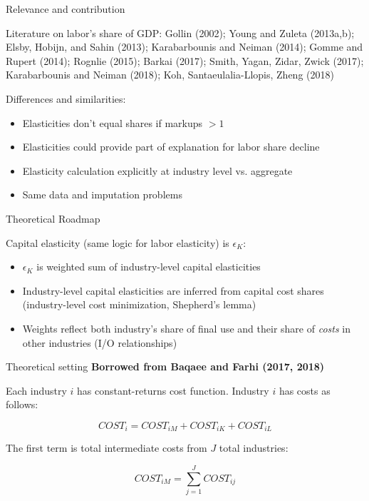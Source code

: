 \documentclass[10pt,xcolor=dvipsnames]{beamer}
\begin{document}
\begin{frame}{Relevance and contribution}

Literature on labor's share of GDP: Gollin (2002); Young and Zuleta (2013a,b); Elsby, Hobijn, and Sahin (2013); Karabarbounis and Neiman (2014); Gomme and Rupert (2014); Rognlie (2015); Barkai (2017); Smith, Yagan, Zidar, Zwick (2017); Karabarbounis and Neiman (2018); Koh, Santaeulalia-Llopis, Zheng (2018)

\vspace{.25in}
Differences and similarities:
\begin{itemize}
  \item Elasticities don't equal shares if markups $>1$
  \item Elasticities could provide part of explanation for labor share decline
  \item Elasticity calculation explicitly at industry level vs. aggregate
  \item Same data and imputation problems
\end{itemize}

\end{frame}


\begin{frame}{Theoretical Roadmap}

Capital elasticity (same logic for labor elasticity) is $\epsilon_K$:
\begin{itemize}
  \item $\epsilon_K$ is weighted sum of industry-level capital elasticities
  \item Industry-level capital elasticities are inferred from capital cost shares (industry-level cost minimization, Shepherd's lemma)
  \item Weights reflect both industry's share of final use and their share of \textit{costs} in other industries (I/O relationships)
\end{itemize}
\end{frame}

\begin{frame}{Theoretical setting}
\textbf{Borrowed from Baqaee and Farhi (2017, 2018)}
\vspace{.25in}

Each industry $i$ has constant-returns cost function. Industry $i$ has costs as follows:

\begin{equation}
  COST_i = COST_{iM} + COST_{iK} + COST_{iL}
\end{equation}

The first term is total intermediate costs from $J$ total industries:

\begin{equation}
  COST_{iM} = \sum_{j=1}^{J} COST_{ij}
\end{equation}

\end{frame}
\end{document}

